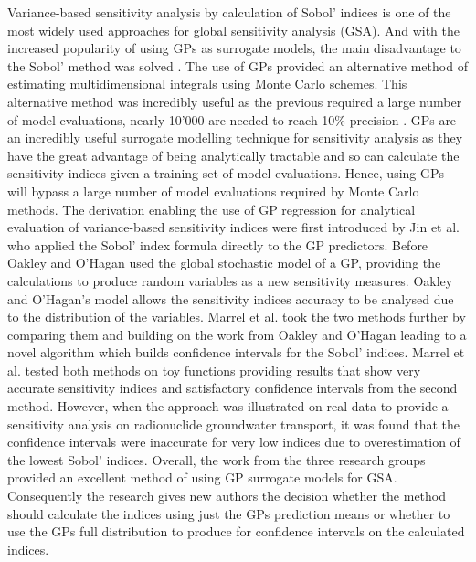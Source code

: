 \documentclass[preprint,12pt]{elsarticle}
\begin{document}
Variance-based sensitivity analysis by calculation of Sobol' indices \cite{Sobol2001} is one of the most widely used approaches for global sensitivity analysis (GSA). And with the increased popularity of using GPs as surrogate models, the main disadvantage to the Sobol' method was solved \cite{Oakley2004,Jin2004,Marrel2009}. The use of GPs provided an alternative method of estimating multidimensional integrals using Monte Carlo schemes. This alternative method was incredibly useful as the previous required a large number of model evaluations, nearly 10'000 are needed to reach 10\% precision \cite{Lamoureux2014}. GPs are an incredibly useful surrogate modelling technique for sensitivity analysis as they have the great advantage of being analytically tractable and so can calculate the sensitivity indices given a training set of model evaluations. Hence, using GPs will bypass a large number of model evaluations required by Monte Carlo methods. The derivation enabling the use of GP regression for analytical evaluation of variance-based sensitivity indices were first introduced by Jin et al. \cite{Jin2004} who applied the Sobol' index formula directly to the GP predictors. Before Oakley and O'Hagan \cite{Oakley2004} used the global stochastic model of a GP, providing the calculations to produce random variables as a new sensitivity measures. Oakley and O'Hagan's \cite{Oakley2004} model allows the sensitivity indices accuracy to be analysed due to the distribution of the variables. Marrel et al. \cite{Marrel2009} took the two methods further by comparing them and building on the work from Oakley and O'Hagan \cite{Oakley2004} leading to a novel algorithm which builds confidence intervals for the Sobol' indices. Marrel et al. \cite{Marrel2009} tested both methods on toy functions providing results that show very accurate sensitivity indices and satisfactory confidence intervals from the second method. However, when the approach was illustrated on real data to provide a sensitivity analysis on radionuclide groundwater transport, it was found that the confidence intervals were inaccurate for very low indices due to overestimation of the lowest Sobol' indices. Overall, the work from the three research groups \cite{Oakley2004,Jin2004,Marrel2009} provided an excellent method of using GP surrogate models for GSA. Consequently the research gives new authors the decision whether the method should calculate the indices using just the GPs prediction means or whether to use the GPs full distribution to produce for confidence intervals on the calculated indices.
	
\end{document}

